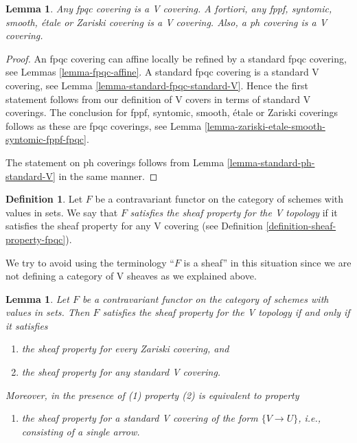 \documentclass{stacks-project}
\theoremstyle{plain}
\newtheorem{lemma}[subsection]{Lemma}
\theoremstyle{definition}
\newtheorem{definition}[subsection]{Definition}
\theoremstyle{remark}
\numberwithin{equation}{subsection}
\begin{document}
\begin{lemma}
\label{lemma-zariski-etale-smooth-syntomic-fppf-fpqc-ph-V}
Any fpqc covering is a V covering. A fortiori,
any fppf, syntomic, smooth, \'etale or Zariski covering is a V covering.
Also, a ph covering is a V covering.
\end{lemma}

\begin{proof}
An fpqc covering can affine locally be refined by a
standard fpqc covering, see Lemmas \ref{lemma-fpqc-affine}.
A standard fpqc covering is a standard V covering, see
Lemma \ref{lemma-standard-fpqc-standard-V}. Hence the first statement
follows from our definition of V covers in terms of standard V coverings.
The conclusion for fppf, syntomic, smooth, \'etale or Zariski coverings
follows as these are fpqc coverings, see
Lemma \ref{lemma-zariski-etale-smooth-syntomic-fppf-fpqc}.

\medskip\noindent
The statement on ph coverings follows from
Lemma \ref{lemma-standard-ph-standard-V} in the same manner.
\end{proof}

\begin{definition}
\label{definition-sheaf-property-V}
Let $F$ be a contravariant functor on the category
of schemes with values in sets. We say that
$F$ {\it satisfies the sheaf property for the V topology}
if it satisfies the sheaf property for any V covering
(see Definition \ref{definition-sheaf-property-fpqc}).
\end{definition}

\noindent
We try to avoid using the terminology ``$F$ is a sheaf'' in this
situation since we are not defining a category of V sheaves
as we explained above.

\begin{lemma}
\label{lemma-sheaf-property-V}
Let $F$ be a contravariant functor on the category
of schemes with values in sets. Then $F$ satisfies
the sheaf property for the V topology if and only
if it satisfies
\begin{enumerate}
\item the sheaf property for every Zariski covering, and
\item the sheaf property for any standard V covering.
\end{enumerate}
Moreover, in the presence of (1) property (2) is equivalent to
property
\begin{enumerate}
\item[(2')] the sheaf property for a standard V covering
of the form $\{V \to U\}$, i.e., consisting of a single arrow.
\end{enumerate}
\end{lemma}
\end{document}
